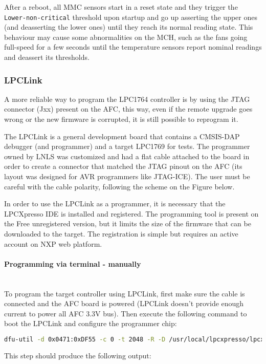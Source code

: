 \documentclass[letterpaper,12pt, titlepage]{article}
\newcommand{\newparagraph}[1]{\paragraph{#1}\mbox{}\\}
\begin{document}
After a reboot, all MMC sensors start in a reset state and they trigger the \texttt{Lower-non-critical} threshold upon startup and go up asserting the upper ones (and deasserting the lower ones) until they reach its normal reading state.
This behaviour may cause some abnormalities on the MCH, such as the fans going full-speed for a few seconds until the temperature sensors report nominal readings and deassert its thresholds.


\subsubsection{LPCLink}
A more reliable way to program the LPC1764 controller is by using the JTAG connector (Jxx) present on the AFC, this way, even if the remote upgrade goes wrong or the new firmware is corrupted, it is still possible to reprogram it.

The LPCLink is a general development board that contains a CMSIS-DAP debugger (and programmer) and a target LPC1769 for tests. The programmer owned by LNLS was customized and had a flat cable attached to the board in order to create a connector that matched the JTAG pinout on the AFC (its layout was designed for AVR programmers like JTAG-ICE).
The user must be careful with the cable polarity, following the scheme on the Figure below.


In order to use the LPCLink as a programmer, it is necessary that the LPCXpresso IDE is installed and registered. The programming tool is present on the Free unregistered version, but it limits the size of the firmware that can be downloaded to the target. The registration is simple but requires an active account on NXP web platform.


\newparagraph{Programming via terminal - manually}
To program the target controller using LPCLink, first make sure the cable is connected and the AFC board is powered (LPCLink doesn't provide enough current to power all AFC 3.3V bus). Then execute the following command to boot the LPCLink and configure the programmer chip:

\begin{lstlisting}[language=bash]
  dfu-util -d 0x0471:0xDF55 -c 0 -t 2048 -R -D /usr/local/lpcxpresso/lpcxpresso/bin/LPCXpressoWIN.enc
\end{lstlisting}

This step should produce the following output:
\end{document}
